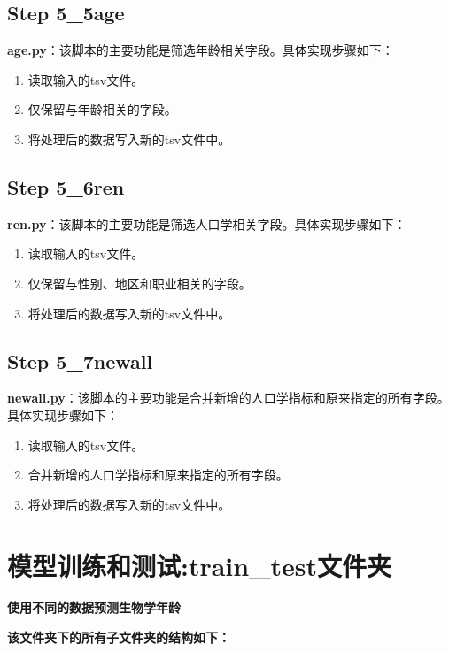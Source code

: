 \documentclass[UTF8]{report}
\theoremstyle{MyLineTheoremStyle} %
\theoremstyle{MyBlockTheoremStyle} %
\theoremstyle{MySubsubsectionStyle} %
\begin{document}
\subsection*{Step 5\_5age}

\textbf{age.py}：该脚本的主要功能是筛选年龄相关字段。具体实现步骤如下：
\begin{enumerate}
    \item 读取输入的tsv文件。
    \item 仅保留与年龄相关的字段。
    \item 将处理后的数据写入新的tsv文件中。
\end{enumerate}


\subsection*{Step 5\_6ren}

\textbf{ren.py}：该脚本的主要功能是筛选人口学相关字段。具体实现步骤如下：
\begin{enumerate}
    \item 读取输入的tsv文件。
    \item 仅保留与性别、地区和职业相关的字段。
    \item 将处理后的数据写入新的tsv文件中。
\end{enumerate}

\subsection*{Step 5\_7newall}

\textbf{newall.py}：该脚本的主要功能是合并新增的人口学指标和原来指定的所有字段。具体实现步骤如下：
\begin{enumerate}
    \item 读取输入的tsv文件。
    \item 合并新增的人口学指标和原来指定的所有字段。
    \item 将处理后的数据写入新的tsv文件中。
\end{enumerate}




\section{模型训练和测试:train\_test文件夹}
\textbf{使用不同的数据预测生物学年龄}\par
\textbf{该文件夹下的所有子文件夹的结构如下：}
\end{document}

